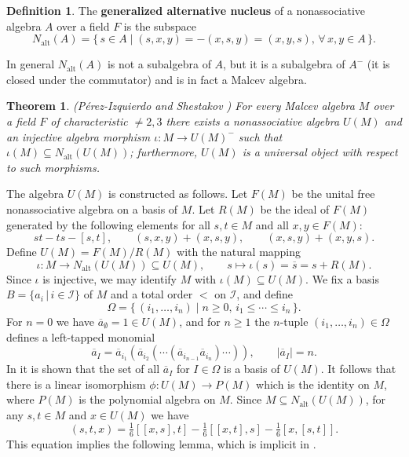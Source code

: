 \documentclass{amsart}
\theoremstyle{plain}
\newtheorem{theorem}[lemma]{Theorem}
\theoremstyle{definition}
\newtheorem{definition}[lemma]{Definition}
\begin{document}
\begin{definition}
The \textbf{generalized alternative nucleus} of a nonassociative algebra $A$
over a field $F$ is the subspace
\[
 N_{\mathrm{alt}}(A)
  =
  \big\{ \,
  s \in A
  \mid
  (s,x,y) = -(x,s,y) = (x,y,s), \, \forall \, x, y \in A
  \, \big\}.
  \]
\end{definition}

In general $N_{\mathrm{alt}}(A)$ is not a subalgebra of $A$, but it is a
subalgebra of $A^-$ (it is closed under the commutator) and is in fact a Malcev
algebra.

\begin{theorem}
\emph{(P\'erez-Izquierdo and Shestakov \cite{PerezIzquierdoShestakov})} For
every Malcev algebra $M$ over a field $F$ of characteristic $\ne 2, 3$ there
exists a nonassociative algebra $U(M)$ and an injective algebra morphism
$\iota\colon M \to U(M)^-$ such that $\iota(M) \subseteq
N_{\mathrm{alt}}(U(M))$; furthermore, $U(M)$ is a universal object with respect
to such morphisms.
\end{theorem}

The algebra $U(M)$ is constructed as follows. Let $F(M)$ be the unital free
nonassociative algebra on a basis of $M$. Let $R(M)$ be the ideal of $F(M)$
generated by the following elements for all $s, t \in M$ and all $x, y \in
F(M)$:
  \[
  st - ts - [s,t],
  \qquad
  (s,x,y) + (x,s,y),
  \qquad
  (x,s,y) + (x,y,s).
  \]
Define $U(M) = F(M)/R(M)$ with the natural mapping
  \[
  \iota\colon M \to N_\mathrm{alt}(U(M)) \subseteq U(M),
  \qquad
  s \mapsto \iota(s) = \overline{s} = s + R(M).
  \]
Since $\iota$ is injective, we may identify $M$ with $\iota(M) \subseteq U(M)$.
We fix a basis $B = \{ a_i \,|\, i \in \mathcal{I} \}$ of $M$ and a total order
$<$ on $\mathcal{I}$, and define
  \[
  \Omega =
  \{ \,
  (i_1,\hdots,i_n)
  \mid
  n \ge 0, \,
  i_1 \le \cdots \le i_n \,
  \}.
  \]
For $n = 0$ we have $\overline{a}_\emptyset = 1 \in U(M)$, and for $n \ge 1$
the $n$-tuple $(i_1,\hdots,i_n) \in \Omega$ defines a left-tapped monomial
  \[
  \overline{a}_I =
  \overline{a}_{i_1} (
  \overline{a}_{i_2} ( \cdots
  ( \overline{a}_{i_{n-1}} \overline{a}_{i_n} )
  \cdots )),
  \qquad
  |\overline{a}_I| = n.
  \]
In \cite{PerezIzquierdoShestakov} it is shown that the set of all
$\overline{a}_I$ for $I \in \Omega$ is a basis of $U(M)$.  It follows that
there is a linear isomorphism $\phi\colon U(M) \to P(M)$ which is the identity
on $M$, where $P(M)$ is the polynomial algebra on $M$. Since $M \subseteq
N_\mathrm{alt}(U(M))$, for any $s, t \in M$ and $x \in U(M)$ we have
  \[
  (s,t,x)
  =
  \tfrac16
  [[x,s],t]
  -
  \tfrac16
  [[x,t],s]
  -
  \tfrac16
  [x,[s,t]].
  \]
This equation implies the following lemma, which is implicit in
\cite{PerezIzquierdoShestakov}.
\end{document}
